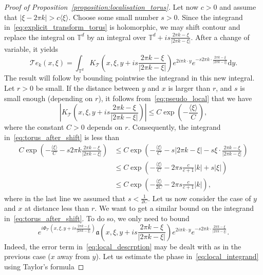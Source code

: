 \documentclass[10pt]{amsart}
\theoremstyle{definition}\newtheorem{defi}[theo]{Definition}\newtheorem{rema}[theo]{Remark}\newtheorem{exam}[theo]{Example}\newtheorem{exem}[theo]{Example}\newtheorem{nota}[theo]{Notation}
\newcommand{\p}[1]{\left(#1\right)}
\newcommand{\va}[1]{\left|#1\right|}
\newcommand{\brac}[1]{\langle #1 \rangle}
\newcommand{\clT}{\mathcal{T}}
\newcommand{\fka}{\mathfrak{a}}
\newcommand{\bbT}{\mathbb{T}}
\newcommand{\rmd}{\mathrm{d}}
\begin{document}
\begin{proof}[Proof of Proposition~\ref{proposition:localisation_torus}]
Let now $c> 0$ and assume that $\va{\xi - 2 \pi k} > c \brac{\xi}$. Choose some small number $s > 0$. Since the integrand in~\eqref{eq:explicit_transform_torus} is holomorphic, we may shift contour and replace the integral on $\bbT^d$ by an integral over $\bbT^d + is\frac{2 \pi k - \xi}{\va{2 \pi k - \xi}}$. After a change of variable, it yields
\begin{equation}\label{eq:torus_after_shift}
\clT e_k (x,\xi) = \int_{\bbT^d} K_{\clT}\left(x,\xi,y + i s \frac{2 \pi k - \xi}{\va{2 \pi k - \xi}}\right) e^{2 i \pi k \cdot y} e^{- s 2 \pi k \cdot \frac{2 \pi k - \xi}{\va{2 \pi k - \xi}}} \rmd y.
\end{equation}
The result will follow by bounding pointwise the integrand in this new integral. Let $r > 0$ be small. If the distance between $y$ and $x$ is larger than $r$, and $s$ is small enough (depending on $r$), it follows from~\eqref{eq:pseudo_local} that we have
\begin{equation*}
\va{K_{\clT}\left(x,\xi,y + i s \frac{2 \pi k - \xi}{\va{2 \pi k - \xi}}\right)} \leq C \exp\p{ - \frac{\brac{\xi}}{C}},
\end{equation*}
where the constant $C > 0$ depends on $r$. Consequently, the integrand in~\eqref{eq:torus_after_shift} is less than
\begin{equation*}
\begin{split}
C \exp\p{ - \frac{\brac{\xi}}{C} - s 2 \pi k \frac{2 \pi k - \xi}{\va{2 \pi k - \xi}} } & \leq C \exp\p{ - \frac{\brac{\xi}}{C} - s \va{2 \pi k - \xi} - s \xi \cdot \frac{2 \pi k - \xi}{\va{2 \pi k - \xi}} } \\
& \leq C \exp\p{ - \frac{\brac{\xi}}{C} - 2 \pi s \frac{c}{c+1} \va{k} + s \va{\xi} } \\
& \leq C \exp\p{ - \frac{\brac{\xi}}{2 C} - 2 \pi s \frac{c}{c+1} \va{k} },
\end{split}
\end{equation*}
where in the last line we assumed that $s < \frac{1}{2C}$. Let us now consider the case of $y$ and $x$ at distance less than $r$. We want to get a similar bound on the integrand in~\eqref{eq:torus_after_shift}. To do so, we only need to bound
\begin{equation}\label{eq:local_integrand}
e^{i\Phi_{\clT}\left(x,\xi,y + i s \frac{2 \pi k - \xi}{\va{2 \pi k - \xi}}\right)} \fka\left(x,\xi, y + i s \frac{2 \pi k - \xi}{\va{2 \pi k - \xi}}\right) e^{2 i \pi k \cdot y} e^{- s 2 \pi k \cdot \frac{2 \pi k - \xi}{\va{2 \pi k - \xi}}}.
\end{equation}
Indeed, the error term in~\eqref{eq:local_descrption} may be dealt with as in the previous case ($x$ away from $y$). Let us estimate the phase in~\eqref{eq:local_integrand} using Taylor's formula

\end{proof}
\end{document}

